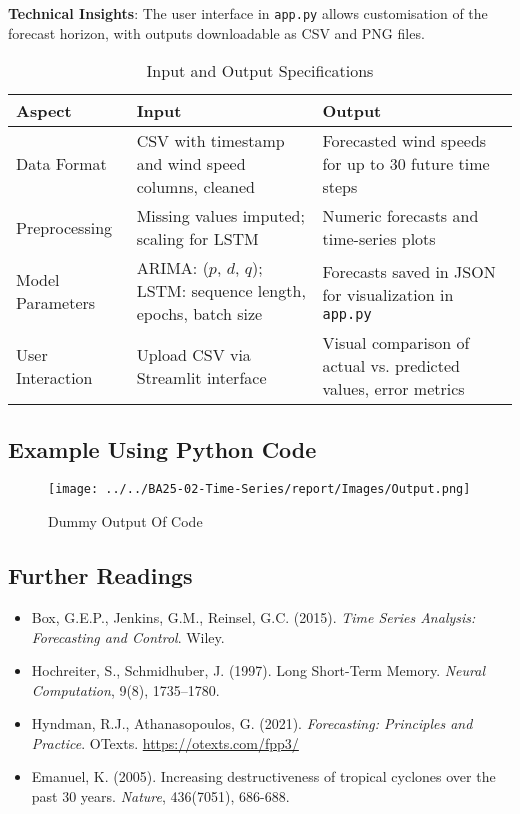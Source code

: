 \textbf{Technical Insights}: The user interface in \texttt{app.py} allows customisation of the forecast horizon, with outputs downloadable as CSV and PNG files.



\begin{table}[h!]
	\centering
	\caption{Input and Output Specifications}
	\begin{tabular}{|p{4cm}|p{5cm}|p{5cm}|}
		\hline
		\textbf{Aspect} & \textbf{Input} & \textbf{Output} \\
		\hline
		Data Format & CSV with timestamp and wind speed columns, cleaned & Forecasted wind speeds for up to 30 future time steps \\
		\hline
		Preprocessing & Missing values imputed; scaling for LSTM & Numeric forecasts and time-series plots \\
		\hline
		Model Parameters & ARIMA: ($p$, $d$, $q$); LSTM: sequence length, epochs, batch size & Forecasts saved in JSON for visualization in \texttt{app.py} \\
		\hline
		User Interaction & Upload CSV via Streamlit interface & Visual comparison of actual vs. predicted values, error metrics \\
		\hline
	\end{tabular}
\end{table}
\subsection{Example Using Python Code}

\begin{figure}[htbp]
	\centering
	\texttt{[image: ../../BA25-02-Time-Series/report/Images/Output.png]}
	\caption{Dummy Output Of Code}
	\label{fig:dummy_output}
\end{figure}

\subsection{Further Readings}

\begin{itemize}
	\item Box, G.E.P., Jenkins, G.M., Reinsel, G.C. (2015). \textit{Time Series Analysis: Forecasting and Control}. Wiley. \cite{BoxEtAl2015}
	\item Hochreiter, S., Schmidhuber, J. (1997). Long Short-Term Memory. \textit{Neural Computation}, 9(8), 1735–1780. \cite{HochreiterSchmidhuber1997}
	\item Hyndman, R.J., Athanasopoulos, G. (2021). \textit{Forecasting: Principles and Practice}. OTexts. \url{https://otexts.com/fpp3/}
	\item Emanuel, K. (2005). Increasing destructiveness of tropical cyclones over the past 30 years. \textit{Nature}, 436(7051), 686-688. \cite{Emanuel2005}
\end{itemize}

